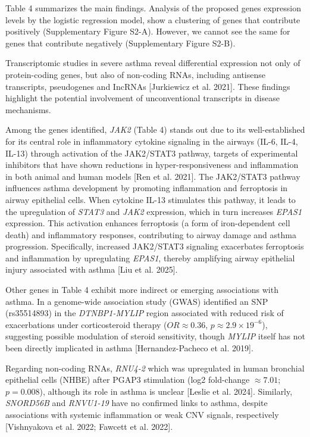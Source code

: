 Table 4 summarizes the main findings. Analysis of the proposed genes expression levels by the logistic regression model, show a clustering of genes that contribute positively (Supplementary Figure S2-A). However, we cannot see the same for genes that contribute negatively (Supplementary Figure S2-B).


Transcriptomic studies in severe asthma reveal differential expression not only of protein-coding genes, but also of non-coding RNAs, including antisense transcripts, pseudogenes and IncRNAs [Jurkiewicz et al. 2021]. These findings highlight the potential involvement of unconventional transcripts in disease mechanisms.

Among the genes identified, \textit{JAK2} (Table 4) stands out due to its well-established for its central role in inflammatory cytokine signaling in the airways (IL-6, IL-4, IL-13) through activation of the JAK2/STAT3 pathway, targets of experimental inhibitors that have shown reductions in hyper-responsiveness and inflammation in both animal and human models [Ren et al. 2021]. The JAK2/STAT3 pathway influences asthma development by promoting inflammation and ferroptosis in airway epithelial cells. When cytokine IL-13 stimulates this pathway, it leads to the upregulation of \textit{STAT3} and \textit{JAK2} expression, which in turn increases \textit{EPAS1} expression. This activation enhances ferroptosis (a form of iron-dependent cell death) and inflammatory responses, contributing to airway damage and asthma progression. Specifically, increased JAK2/STAT3 signaling exacerbates ferroptosis and inflammation by upregulating \textit{EPAS1}, thereby amplifying airway epithelial injury associated with asthma [Liu et al. 2025].

Other genes in Table 4 exhibit more indirect or emerging associations with asthma. In a genome-wide association study (GWAS) identified an SNP (rs35514893) in the \textit{DTNBP1-MYLIP} region associated with reduced risk of exacerbations under corticosteroid therapy ($OR \approx 0.36$, $p \approx 2.9 \times 19^{-6}$), suggesting possible modulation of steroid sensitivity, though \textit{MYLIP} itself has not been directly implicated in asthma [Hernandez-Pacheco et al. 2019].

Regarding non-coding RNAs, \textit{RNU4-2} which was upregulated in human bronchial epithelial cells (NHBE) after PGAP3 stimulation (log2 fold-change $\approx7.01$; $p = 0.008$), although its role in asthma is unclear [Leslie et al. 2024]. Similarly, \textit{SNORD56B} and \textit{RNVU1-19} have no confirmed links to asthma, despite associations with systemic inflammation or weak CNV signals, respectively [Vishnyakova et al. 2022; Fawcett et al. 2022].

